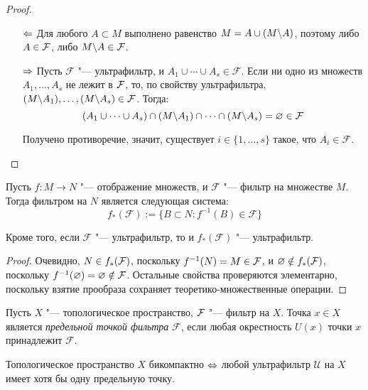 \begin{proof}~
    \begin{itemize}
        \item[$\Leftarrow$] Для любого $A \subset M$ выполнено равенство $M = A \cup (M \backslash A)$, поэтому либо $A \in \mathcal F$, либо $M \backslash A \in \mathcal F$.

        \item[$\Rightarrow$] Пусть $\mathcal{F}$ "--- ультрафильтр, и $A_1 \cup \dotsb \cup A_s \in\mathcal{F}$. Если ни одно из множеств $A_1, \dotsc, A_s$ не лежит в $\mathcal F$, то, по свойству ультрафильтра, $(M \backslash A_1), \dotsc, (M \backslash A_s) \in \mathcal F$. Тогда:
        \[(A_1 \cup \dotsb \cup A_s) \cap (M \backslash A_1) \cap \dotsb \cap (M \backslash A_s) = \varnothing \in \mathcal F\]

        Получено противоречие, значит, существует $i \in \{1, \dotsc, s\}$ такое, что $A_i \in \mathcal{F}$.\qedhere
    \end{itemize}
\end{proof}

\begin{proposition}\label{randomprop}
    Пусть $f: M \rightarrow N$ "--- отображение множеств, и $\mathcal{F}$ "--- фильтр на множестве $M$. Тогда фильтром на $N$ является следующая система:
    \[f_*(\mathcal{F}) := \lbrace B \subset N : f^{-1}(B)\in\mathcal{F}\rbrace\]

    Кроме того, если $\mathcal{F}$ "--- ультрафильтр, то и $f_*(\mathcal{F})$ "--- ультрафильтр.
\end{proposition}

\begin{proof}
    Очевидно, $N \in f_*(\mathcal F)$, поскольку $f^{-1}(N) = M \in \mathcal F$, и $\varnothing \notin f_*(\mathcal F)$, поскольку $f^{-1}(\varnothing) = \varnothing \notin \mathcal F$. Остальные свойства проверяются элементарно, поскольку взятие прообраза сохраняет теоретико-множественные операции.
\end{proof}

\begin{definition}
    Пусть $X$ "--- топологическое пространство, $\mathcal F$ "--- фильтр на $X$. Точка $x \in X$ является \textit{предельной точкой фильтра} $\mathcal{F}$, если любая окрестность $U(x)$ точки $x$ принадлежит $\mathcal{F}$.
\end{definition}

\begin{proposition}
    Топологическое пространство $X$ бикомпактно $\Leftrightarrow$ любой ультрафильтр $\mathcal{U}$ на $X$ имеет хотя бы одну предельную точку.
\end{proposition}

